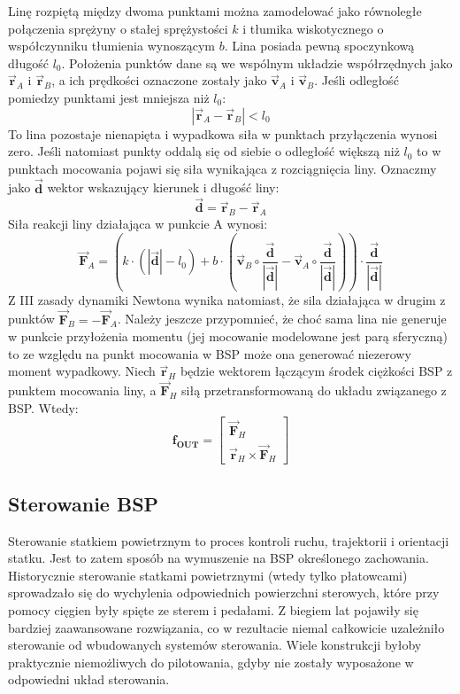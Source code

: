 Linę rozpiętą między dwoma punktami można zamodelować jako równoległe połączenia sprężyny o stałej sprężystości $k$ i tłumika wiskotycznego o współczynniku tłumienia wynoszącym $b$. Lina posiada pewną spoczynkową długość $l_0$. Położenia punktów dane są we wspólnym układzie współrzędnych jako $\vec{\bm{r}}_{A}$ i $\vec{\bm{r}}_{B}$, a ich prędkości oznaczone zostały jako $\vec{\bm{v}}_{A}$ i $\vec{\bm{v}}_{B}$. Jeśli odległość pomiedzy punktami jest mniejsza niż $l_0$:
\[
	| \vec{\bm{r}}_{A} - \vec{\bm{r}}_{B} | < l_0
\]
To lina pozostaje nienapięta i wypadkowa siła w punktach przyłączenia wynosi zero. Jeśli natomiast punkty oddalą się od siebie o odległość większą niż $l_0$ to w punktach mocowania pojawi się siła wynikająca z rozciągnięcia liny. Oznaczmy jako $\vec{\bm{d}}$ wektor wskazujący kierunek i długość liny:
\[
	\vec{\bm{d}} =  \vec{\bm{r}}_{B} - \vec{\bm{r}}_{A}
\]
Siła reakcji liny działająca w punkcie A wynosi:
\[
	\vec{\bm{F}}_{A} =\left(  k \cdot \left( |\vec{\bm{d}}| - l_0 \right) + b \cdot \left( \vec{\bm{v}}_{B}  \circ \frac{\vec{\bm{d}}}{|\vec{\bm{d}}|} - \vec{\bm{v}}_{A} \circ \frac{\vec{\bm{d}}}{|\vec{\bm{d}}|} \right) \right)  \cdot \frac{\vec{\bm{d}}}{|\vec{\bm{d}}|}
\]
Z III zasady dynamiki Newtona wynika natomiast, że sila działająca w drugim z punktów $\vec{\bm{F}}_{B} = - \vec{\bm{F}}_{A}$. Należy jeszcze przypomnieć, że choć sama lina nie generuje w punkcie przyłożenia momentu (jej mocowanie modelowane jest parą sferyczną) to ze względu na punkt mocowania w BSP może ona generować niezerowy moment wypadkowy. Niech $\vec{\bm{r}}_{H}$ będzie wektorem łączącym środek ciężkości BSP z punktem mocowania liny, a $\vec{\bm{F}}_{H}$ siłą przetransformowaną do układu związanego z BSP. Wtedy:
\[
	\bm{f_{OUT}} = \begin{bmatrix} \vec{\bm{F}}_{H} \\ \vec{\bm{r}}_{H} \times \vec{\bm{F}}_{H} \end{bmatrix}
\]


\subsection{Sterowanie BSP}

Sterowanie statkiem powietrznym to proces kontroli ruchu, trajektorii i orientacji statku. Jest to zatem sposób na wymuszenie na BSP określonego zachowania. Historycznie sterowanie statkami powietrznymi (wtedy tylko płatowcami) sprowadzało się do wychylenia odpowiednich powierzchni sterowych, które przy pomocy cięgien były spięte ze sterem i pedałami. Z biegiem lat pojawiły się bardziej zaawansowane rozwiązania, co w rezultacie niemal całkowicie uzależniło sterowanie od wbudowanych systemów sterowania. Wiele konstrukcji byłoby praktycznie niemożliwych do pilotowania, gdyby nie zostały wyposażone w odpowiedni układ sterowania.\\


